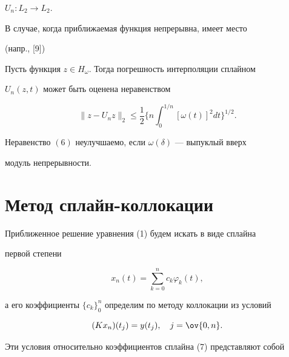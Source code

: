 $U_n:L_2\to L_2$. 


 


В случае, когда приближаемая функция непрерывна, имеет место 


(напр., [9]) 


 


 


\begin{lem} 


Пусть функция $z\in H_\omega$. Тогда погрешность интерполяции сплайном 


$U_n(z,t)$ может быть оценена неравенством 


\begin{equation} 


\|z-U_n z\|_2\le\frac{1}{2}\bigg\{n\int^{1/n}_0[\omega(t)]^2 


dt\bigg\}^{1/2}. 


\end{equation} 


Неравенство $(6)$ неулучшаемо, если $\omega(\delta)$ --- выпуклый вверх 


модуль непрерывности. 


\end{lem} 


 


 


\section{Метод сплайн-коллокации} 


 


Приближенное решение уравнения (1) будем искать в виде сплайна 


первой степени 


\begin{equation} 


x_n(t)=\sum^n_{k=0}c_k\varphi_k(t), 


\end{equation} 


а его коэффициенты $\{c_k\}^n_0$ определим по методу коллокации из условий 


$$ 


(Kx_n)(t_j)=y(t_j),\quad j=\ov{0,n}. 


$$ 


Эти условия относительно коэффициентов сплайна (7) представляют собой 


